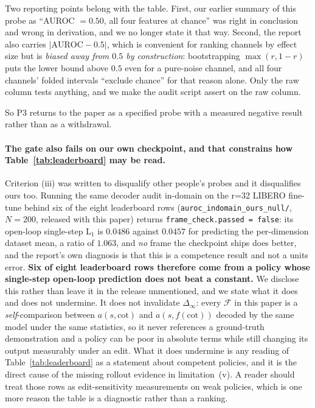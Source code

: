 \documentclass{article}
\begin{document}
Two reporting points belong with the table. First, our earlier summary of this probe as ``AUROC $=0.50$, all four features at chance'' was right in conclusion and wrong in derivation, and we no longer state it that way. Second, the report also carries $|\text{AUROC}-0.5|$, which is convenient for ranking channels by effect size but is \emph{biased away from $0.5$ by construction}: bootstrapping $\max(r, 1-r)$ puts the lower bound above $0.5$ even for a pure-noise channel, and all four channels' folded intervals ``exclude chance'' for that reason alone. Only the raw column tests anything, and we make the audit script assert on the raw column.

So P3 returns to the paper as a specified probe with a measured negative result rather than as a withdrawal.

\paragraph{The gate also fails on our own checkpoint, and that constrains how Table~\ref{tab:leaderboard} may be read.} Criterion (iii) was written to disqualify other people's probes and it disqualifies ours too. Running the same decoder audit in-domain on the \mbox{r=32} LIBERO fine-tune behind six of the eight leaderboard rows (\texttt{auroc\_indomain\_ours\_null/}, $N{=}200$, released with this paper) returns \texttt{frame\_check.passed = false}: its open-loop single-step L$_1$ is $0.0486$ against $0.0457$ for predicting the per-dimension dataset mean, a ratio of $1.063$, and \emph{no} frame the checkpoint ships does better, and the report's own diagnosis is that this is a competence result and not a units error. \textbf{Six of eight leaderboard rows therefore come from a policy whose single-step open-loop prediction does not beat a constant.} We disclose this rather than leave it in the release unmentioned, and we state what it does and does not undermine. It does not invalidate $\Delta_\infty$: every $\mathcal{F}$ in this paper is a \emph{self}-comparison between $a(s,\text{cot})$ and $a(s,f(\text{cot}))$ decoded by the same model under the same statistics, so it never references a ground-truth demonstration and a policy can be poor in absolute terms while still changing its output measurably under an edit. What it does undermine is any reading of Table~\ref{tab:leaderboard} as a statement about competent policies, and it is the direct cause of the missing rollout evidence in limitation~(v). A reader should treat those rows as edit-sensitivity measurements on weak policies, which is one more reason the table is a diagnostic rather than a ranking.
\end{document}
